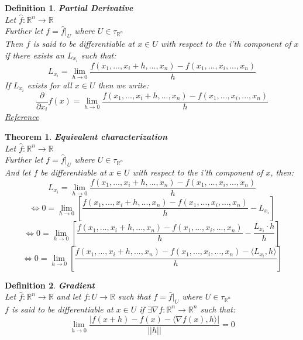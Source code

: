 \documentclass[12pt]{extarticle}
\theoremstyle{plain}
\newtheorem{thm}{Theorem}[section]
\theoremstyle{Definition}
\newtheorem{def.}{Definition}[section]
\theoremstyle{Definition}
\theoremstyle{plain}
\begin{document}
\begin{def.} \textbf{Partial Derivative} \\
	Let $\hat{f} : \mathbb{R}^n \to \mathbb{R}$ \\
	Further let $f = \hat{f}|_U$ where $U \in \tau_{\mathbb{R}^n}$ \\ 
	Then $f$ is said to be differentiable at $x \in U$ with respect to the i'th component of $x$ if there exists an $L_{x_i}$ such that: \\  
	$$L_{x_i} = \lim_{h \to 0} \frac{f(x_1,...,x_i + h,...,x_n) - f(x_1,...,x_i,...,x_n)}{h}$$
	If $L_{x_i}$ exists for all $x \in U$ then we write: \\ 
	$$\frac{\partial}{\partial x_i} f(x) = \lim_{h \to 0} \frac{f(x_1,...,x_i + h,...,x_n) - f(x_1,...,x_i,...,x_n)}{h}$$ 
	\href{https://en.wikipedia.org/wiki/Partial_derivative}{Reference}
\end{def.}
\begin{thm} \textbf{Equivalent characterization} \\ 
	Let $\hat{f} : \mathbb{R}^n \to \mathbb{R}$ \\
	Further let $f = \hat{f}|_U$ where $U \in \tau_{\mathbb{R}^n}$ \\ 
	And let $f$ be differentiable at $x \in U$ with respect to the i'th component of $x$, then: 
	$$L_{x_i} = \lim_{h \to 0} \frac{f(x_1,...,x_i + h,...,x_n) - f(x_1,...,x_i,...,x_n)}{h}$$
	$$\Leftrightarrow 0 = \lim_{h \to 0} \left[\frac{f(x_1,...,x_i + h,...,x_n) - f(x_1,...,x_i,...,x_n)}{h} - L_{x_i}\right]$$
	$$\Leftrightarrow 0 = \lim_{h \to 0} \left[\frac{f(x_1,...,x_i + h,...,x_n) - f(x_1,...,x_i,...,x_n)}{h} - \frac{L_{x_i} \cdot h}{h}\right]$$
	$$\Leftrightarrow 0 = \lim_{h \to 0} \left[\frac{f(x_1,...,x_i + h,...,x_n) - f(x_1,...,x_i,...,x_n) - \langle L_{x_i} , h \rangle}{h}  \right]$$	
\end{thm}
\begin{def.} \textbf{Gradient} \\ 
	Let $\hat{f} : \mathbb{R}^n \to \mathbb{R}$ and let $f : U \to \mathbb{R}$ such that $f = \hat{f}|_U$ where $U \in \tau_{\mathbb{R}^n}$ \\ 
	$f$ is said to be differentiable at $x \in U$ if $\exists \nabla f : \mathbb{R}^n \to \mathbb{R}^n$ such that: \\  	
	$$\lim_{h \to 0}\frac{|f(x + h) - f(x) - \langle \nabla f(x),h \rangle|}{||h||} = 0$$ 
\end{def.} 
\end{document}
